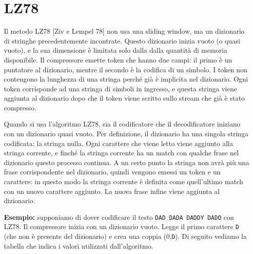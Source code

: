 \section{LZ78}
Il metodo LZ78 [Ziv e Lempel 78] non usa una sliding window, ma un dizionario di stringhe precedentemente incontrate.
Questo dizionario inizia vuoto (o quasi vuoto), e la sua dimensione è limitata solo dalla
dalla quantità di memoria disponibile.
Il compressore emette token che hanno due campi: il primo è un puntatore al
dizionario, mentre il secondo è la codifica di un simbolo.
I token non contengono la lunghezza di una stringa perché già è implicita nel
dizionario.
Ogni token corrisponde ad una stringa di simboli in ingresso, e questa stringa viene aggiunta
al dizionario dopo che il token viene scritto sullo stream che già è stato compresso.

\vspace{5mm}

Quando si usa l'algoritmo LZ78, sia il codificatore che il decodificatore iniziano con un dizionario quasi
vuoto. Per definizione, il dizionario ha una singola stringa codificata: la stringa nulla. Ogni carattere che viene letto viene aggiunto alla stringa corrente, e finché la stringa corrente
ha un match con qualche frase nel dizionario questo processo continua.
A un certo punto la stringa non avrà più una frase corrispondente nel dizionario, quindi vengono emessi un token e un carattere: in questo modo la stringa corrente è definita come quell'ultimo match con un nuovo carattere
aggiunto. La nuova frase infine viene aggiunta al dizionario.

\vspace{5mm}

\textbf{Esempio:} supponiamo di dover codificare il testo \texttt{DAD DADA DADDY DADO} con LZ78. Il compressore inizia con un dizionario vuoto. Legge il primo carattere \texttt{D} (che non è presente del dizionario) e crea una coppia (0,\texttt{D}). Di seguito vediamo la tabella che indica i valori utilizzati dall'algoritmo.

